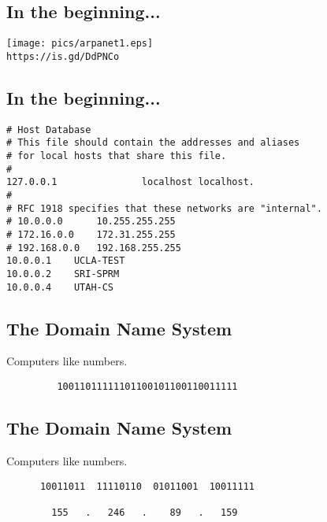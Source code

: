 \documentclass[xga]{xdvislides}
\begin{document}
\subsection{In the beginning...}
\vspace*{\fill}
\begin{center}
	\texttt{[image: pics/arpanet1.eps]} \\
	{\tt https://is.gd/DdPNCo} \\
\end{center}
\vspace*{\fill}


\subsection{In the beginning...}
\begin{verbatim}
# Host Database
# This file should contain the addresses and aliases
# for local hosts that share this file.
#
127.0.0.1               localhost localhost.
#
# RFC 1918 specifies that these networks are "internal".
# 10.0.0.0      10.255.255.255
# 172.16.0.0    172.31.255.255
# 192.168.0.0   192.168.255.255
10.0.0.1	UCLA-TEST
10.0.0.2	SRI-SPRM
10.0.0.4	UTAH-CS
\end{verbatim}

%

\subsection{The Domain Name System}
\vspace{.5in}
\begin{center}
	\Huge
	Computers like numbers. \\
\vspace{.5in}
\begin{verbatim}
         10011011111101100101100110011111
\end{verbatim}
\end{center}
\Normalsize

\subsection{The Domain Name System}
\vspace{.5in}
\begin{center}
	\Huge
	Computers like numbers. \\
\vspace{.5in}
\begin{verbatim}
      10011011  11110110  01011001  10011111

        155   .   246   .    89   .   159
\end{verbatim}
\end{center}
\Normalsize
\end{document}
